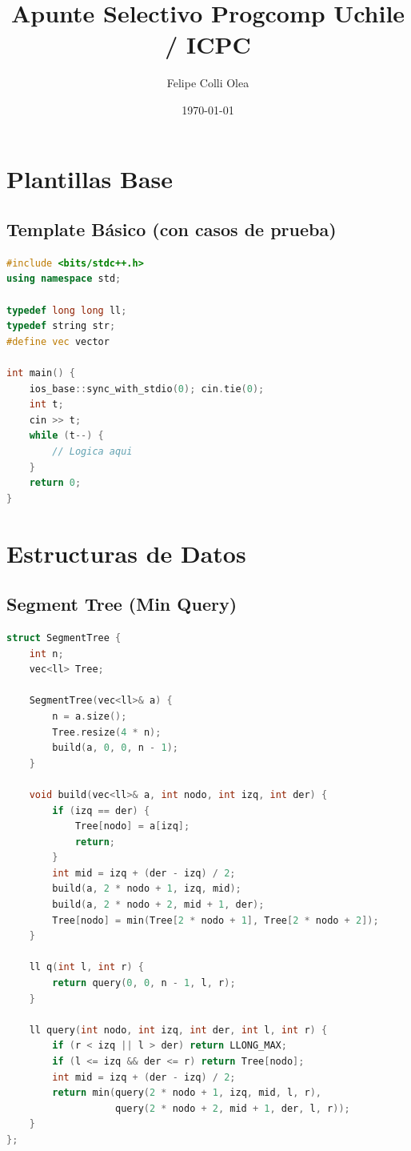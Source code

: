 \documentclass[11pt]{article}
\title{\textbf{Apunte Selectivo Progcomp Uchile / ICPC}}
\author{Felipe Colli Olea}
\date{\today}
\begin{document}
\maketitle
\thispagestyle{fancy}
\tableofcontents
\newpage

\section{Plantillas Base}

\subsection{Template Básico (con casos de prueba)}
\begin{lstlisting}[language=C++]
#include <bits/stdc++.h>
using namespace std;

typedef long long ll;
typedef string str;
#define vec vector

int main() {
    ios_base::sync_with_stdio(0); cin.tie(0);
    int t;
    cin >> t;
    while (t--) {
        // Logica aqui
    }
    return 0;
}
\end{lstlisting}

\section{Estructuras de Datos}

\subsection{Segment Tree (Min Query)}
\begin{lstlisting}[language=C++]
struct SegmentTree {
    int n;
    vec<ll> Tree;

    SegmentTree(vec<ll>& a) {
        n = a.size();
        Tree.resize(4 * n);
        build(a, 0, 0, n - 1);
    }

    void build(vec<ll>& a, int nodo, int izq, int der) {
        if (izq == der) {
            Tree[nodo] = a[izq];
            return;
        }
        int mid = izq + (der - izq) / 2;
        build(a, 2 * nodo + 1, izq, mid);
        build(a, 2 * nodo + 2, mid + 1, der);
        Tree[nodo] = min(Tree[2 * nodo + 1], Tree[2 * nodo + 2]);
    }

    ll q(int l, int r) {
        return query(0, 0, n - 1, l, r);
    }

    ll query(int nodo, int izq, int der, int l, int r) {
        if (r < izq || l > der) return LLONG_MAX;
        if (l <= izq && der <= r) return Tree[nodo];
        int mid = izq + (der - izq) / 2;
        return min(query(2 * nodo + 1, izq, mid, l, r),
                   query(2 * nodo + 2, mid + 1, der, l, r));
    }
};
\end{lstlisting}
\end{document}
